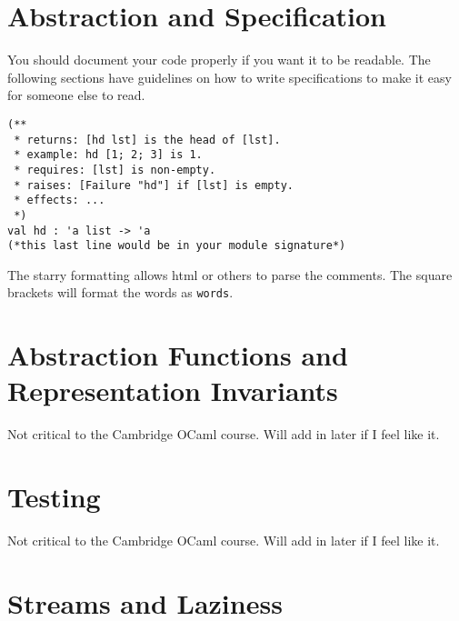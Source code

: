 \documentclass[12pt,a4paper]{article} %
\begin{document}
\section{Abstraction and Specification}
You should document your code properly if you want it to be readable. The following sections have guidelines on how to write specifications to make it easy for someone else to read.
\begin{lstlisting}[language=caml]
(**
 * returns: [hd lst] is the head of [lst].
 * example: hd [1; 2; 3] is 1.
 * requires: [lst] is non-empty.
 * raises: [Failure "hd"] if [lst] is empty.
 * effects: ...
 *)
val hd : 'a list -> 'a
(*this last line would be in your module signature*)
\end{lstlisting}
The starry formatting allows html or others to parse the comments. The square brackets will format the words as \verb|words|.
\section{Abstraction Functions and Representation Invariants}
Not critical to the Cambridge OCaml course. Will add in later if I feel like it.
\section{Testing}
Not critical to the Cambridge OCaml course. Will add in later if I feel like it.
\section{Streams and Laziness}
\end{document}
